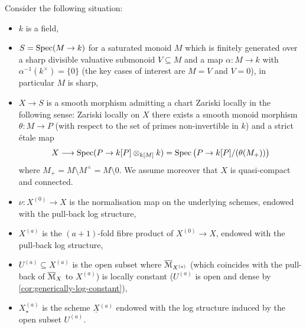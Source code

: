 \begin{setup} \label{setup:surgery}
Consider the following situation: 
\begin{itemize}
    \item 
    $k$ is a field,
    
    \item 
    $S = \operatorname{Spec}(M\to k)$ for a saturated monoid $M$ which is finitely generated over a sharp divisible valuative submonoid $V\subseteq M$ and a map $\alpha\colon M\to k$ with $\alpha^{-1}(k^\times) = \{0\}$ (the key cases of interest are $M=V$ and $V=0$), in particular $M$ is sharp,
    
    \item 
    $X\to S$ is a smooth morphism admitting a chart Zariski locally in the following sense: Zariski locally on $X$ there exists a smooth monoid morphism $\theta\colon M\to P$ (with respect to the set of primes non-invertible in $k$) and a strict \'etale map
    \[
        X \longrightarrow \operatorname{Spec}(P\to k[P]\otimes_{k[M]} k) = \operatorname{Spec}\big(P\to k[P]/(\theta(M_+))\big)
    \]
    where $M_+ = M\setminus M^\times = M \setminus 0$.
    We assume moreover that $X$ is quasi-compact and connected.
     
    \item $\nu\colon X^{(0)}\to X$ is the normalisation map on the underlying schemes, endowed with the pull-back log structure,
    
    \item $X^{(a)}$ is the $(a+1)$-fold fibre product of $X^{(0)}\to X$, endowed with the pull-back log structure,
    
    \item $U^{(a)}\subseteq X^{(a)}$ is the open subset where $\overline{{\mathcal M}}_{X^{(a)}}$ (which coincides with the pull-back of $\overline{{\mathcal M}}_X$ to $X^{(a)}$) is locally constant ($U^{(a)}$ is open and dense by \cref{cor:generically-log-constant}),
    
    \item $X^{(a)}_\star$ is the scheme $\underline{X}{}^{(a)}$ endowed with the log structure induced by the open subset $U^{(a)}$.
\end{itemize}
\end{setup}

